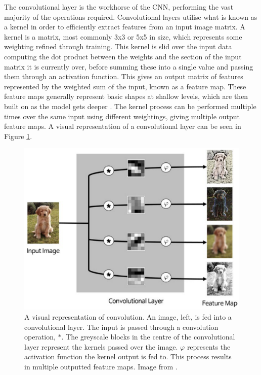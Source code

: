 The convolutional layer is the workhorse of the CNN, performing the vast majority of the operations required. Convolutional layers utilise what is known as a kernel in order to efficiently extract features from an input image matrix. A kernel is a matrix, most commonly 3x3 or 5x5 in size, which represents some weighting refined through training. This kernel is slid over the input data computing the dot product between the weights and the section of the input matrix it is currently over, before summing these into a single value and passing them through an activation function. This gives an output matrix of features represented by the weighted sum of the input, known as a feature map. These feature maps generally represent basic shapes at shallow levels, which are then built on as the model gets deeper \cite{kim_convolutional_2017}. The kernel process can be performed multiple times over the same input using different weightings, giving multiple output feature maps. A visual representation of a convolutional layer can be seen in Figure \ref{fig:convolution}.

\begin{figure}
	\begin{center}
		\includegraphics[scale=0.45]{Chapter2/figs/convolution.png}
	\end{center}
	\caption{A visual representation of convolution. An image, left, is fed into a convolutional layer. The input is passed through a convolution operation, $*$. The greyscale blocks in the centre of the convolutional layer represent the kernels passed over the image. $\varphi$ represents the activation function the kernel output is fed to. This process results in multiple outputted feature maps. Image from \cite{kim_convolutional_2017}.}
	\label{fig:convolution}
\end{figure}

